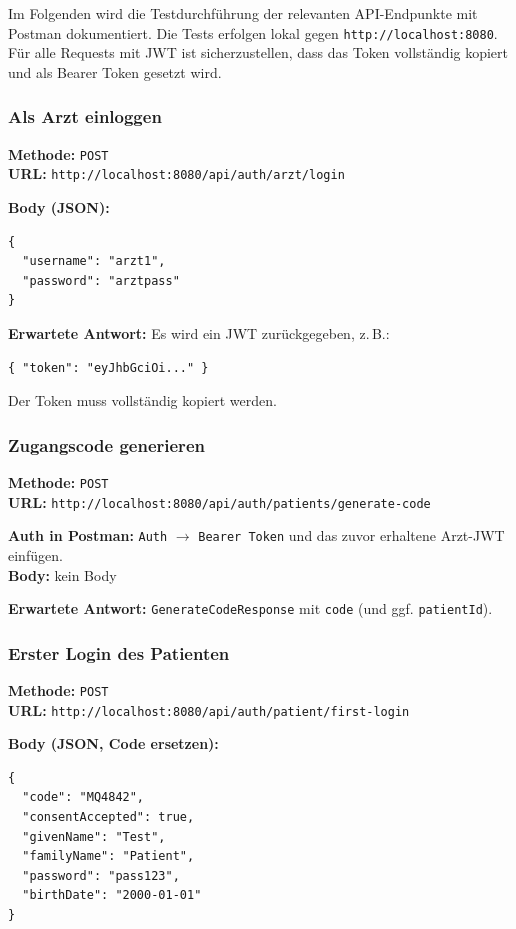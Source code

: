 Im Folgenden wird die Testdurchführung der relevanten API-Endpunkte mit Postman dokumentiert. Die Tests erfolgen lokal gegen \texttt{http://localhost:8080}. Für alle Requests mit JWT ist sicherzustellen, dass das Token vollständig kopiert und als Bearer Token gesetzt wird.

\subsubsection{Als Arzt einloggen}
\textbf{Methode:} \texttt{POST}\\
\textbf{URL:} \texttt{http://localhost:8080/api/auth/arzt/login}

\textbf{Body (JSON):}
\begin{verbatim}
{
  "username": "arzt1",
  "password": "arztpass"
}
\end{verbatim}

\textbf{Erwartete Antwort:} Es wird ein JWT zurückgegeben, z.\,B.:
\begin{verbatim}
{ "token": "eyJhbGciOi..." }
\end{verbatim}
Der Token muss vollständig kopiert werden.

\subsubsection{Zugangscode generieren}
\textbf{Methode:} \texttt{POST}\\
\textbf{URL:} \texttt{http://localhost:8080/api/auth/patients/generate-code}

\textbf{Auth in Postman:} \texttt{Auth} $\rightarrow$ \texttt{Bearer Token} und das zuvor erhaltene Arzt-JWT einfügen.\\
\textbf{Body:} kein Body

\textbf{Erwartete Antwort:} \texttt{GenerateCodeResponse} mit \texttt{code} (und ggf. \texttt{patientId}).

\subsubsection{Erster Login des Patienten}
\textbf{Methode:} \texttt{POST}\\
\textbf{URL:} \texttt{http://localhost:8080/api/auth/patient/first-login}

\textbf{Body (JSON, Code ersetzen):}
\begin{verbatim}
{
  "code": "MQ4842",
  "consentAccepted": true,
  "givenName": "Test",
  "familyName": "Patient",
  "password": "pass123",
  "birthDate": "2000-01-01"
}
\end{verbatim}

